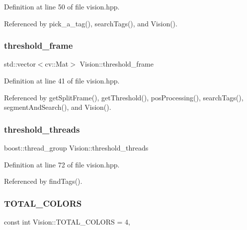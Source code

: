 Definition at line 50 of file vision.\+hpp.



Referenced by pick\+\_\+a\+\_\+tag(), search\+Tags(), and Vision().

\mbox{\label{class_vision_a2fee2db2d4fe0cee6b2de36ee0eb6c7f}} 
\subsubsection{\texorpdfstring{threshold\+\_\+frame}{threshold\_frame}}
{\footnotesize\ttfamily std\+::vector$<$cv\+::\+Mat$>$ Vision\+::threshold\+\_\+frame\hspace{0.3cm}{\ttfamily [private]}}



Definition at line 41 of file vision.\+hpp.



Referenced by get\+Split\+Frame(), get\+Threshold(), pos\+Processing(), search\+Tags(), segment\+And\+Search(), and Vision().

\mbox{\label{class_vision_a2be0ca7754ab9d3c7a71041f87d43b1e}} 
\subsubsection{\texorpdfstring{threshold\+\_\+threads}{threshold\_threads}}
{\footnotesize\ttfamily boost\+::thread\+\_\+group Vision\+::threshold\+\_\+threads\hspace{0.3cm}{\ttfamily [private]}}



Definition at line 72 of file vision.\+hpp.



Referenced by find\+Tags().

\mbox{\label{class_vision_a9fbea649a805b17ad9ea18f3f06c14f2}} 
\subsubsection{\texorpdfstring{T\+O\+T\+A\+L\+\_\+\+C\+O\+L\+O\+RS}{TOTAL\_COLORS}}
{\footnotesize\ttfamily const int Vision\+::\+T\+O\+T\+A\+L\+\_\+\+C\+O\+L\+O\+RS = 4\hspace{0.3cm}{\ttfamily [static]}, {\ttfamily [private]}}



